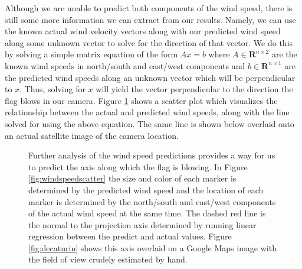 Although we are unable to predict both components of the wind speed, there is still some more information we can extract from our results. Namely, we can use the known actual wind velocity vectors along with our predicted wind speed along some unknown vector to solve for the direction of that vector. We do this by solving a simple matrix equation of the form $Ax=b$ where $A \in \mathbf{R}^{n\times 2}$ are the known wind speeds in north/south and east/west components and $b \in \mathbf{R}^{n \times 1}$ are the predicted wind speeds along an unknown vector which will be perpendicular to $x$. Thus, solving for $x$ will yield the vector perpendicular to the direction the flag blows in our camera. Figure \ref{fig:winddirpred} shows a scatter plot which visualizes the relationship between the actual and predicted wind speeds, along with the line solved for using the above equation. The same line is shown below overlaid onto an actual satellite image of the camera location.
\begin{figure}
	\centering
	\caption{Further analysis of the wind speed predictions provides a way for us to predict the axis along which the flag is blowing. In Figure \ref{fig:windspeedscatter} the size and color of each marker is determined by the predicted wind speed and the location of each marker is determined by the north/south and east/west components of the actual wind speed at the same time. The dashed red line is the normal to the projection axis determined by running linear regression between the predict and actual values. Figure \ref{fig:decaturin} shows this axis overlaid on a Google Maps image with the field of view crudely estimated by hand.}
	\label{fig:winddirpred}
\end{figure}

